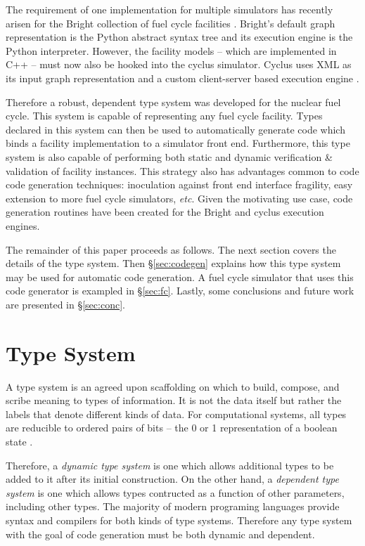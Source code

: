 \documentclass{ansconfpaper}
\begin{document}
The requirement of one implementation for multiple simulators has recently
arisen for the Bright collection of fuel cycle facilities \cite{Scopatz2009}.
Bright's default graph representation is the Python abstract syntax tree and its
execution engine is the Python interpreter.  However, the facility models -- 
which are implemented in C++ -- must now also be hooked into the cyclus simulator.  
Cyclus uses XML as its input graph representation and a custom client-server based 
execution engine \cite{cyclus2012}.

Therefore a robust, dependent type system was developed for the nuclear fuel cycle.
This system is capable of representing any fuel cycle facility.  Types declared in 
this system can then be used to automatically generate code which binds a facility 
implementation to a simulator front end.  
Furthermore, this type system is also capable of performing both static and dynamic
verification \& validation of facility instances.
This strategy also has advantages common to code code generation techniques:
inoculation against front end interface fragility, easy 
extension to more fuel cycle simulators, \emph{etc}.
Given the motivating use case, code 
generation routines have been created for the Bright and cyclus execution engines.

The remainder of this paper proceeds as follows.  The next section covers the 
details of the type system.  Then \S \ref{sec:codegen} explains how this type system
may be used for automatic code generation.  A fuel cycle simulator that uses this
code generator is exampled in \S \ref{sec:fc}.  Lastly, some conclusions and future
work are presented in \S \ref{sec:conc}.

\section{Type System}
\label{sec:ts}

A type system is an agreed upon scaffolding on which to build, compose, and scribe 
meaning to types of information.  It is not the data itself but rather the labels
that denote different kinds of data.  For computational systems, all types are 
reducible to ordered pairs of bits -- the 0 or 1 representation of a boolean state
\cite{DBLP:journals/jsyml/Church40}.

Therefore, a \emph{dynamic type system} is one which allows additional types to 
be added to it after its initial construction.  On the other hand, a \emph{dependent 
type system} is one which allows types contructed as a function of other parameters, 
including other types.  The majority of modern programing languages provide 
syntax and compilers for both kinds of type systems.  Therefore any type system with
the goal of code generation must be both dynamic and dependent.
\end{document}
